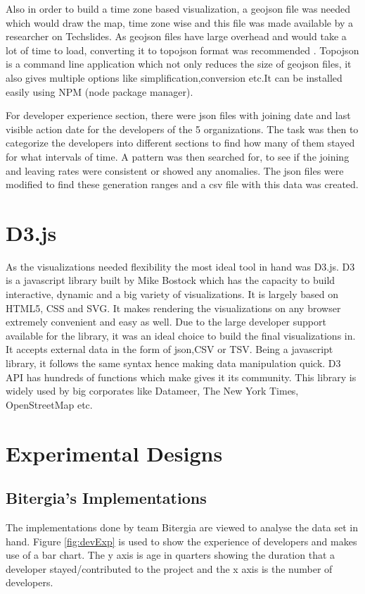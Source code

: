 \documentclass[seploa]{beavtex}
\begin{document}
Also in order to build a time zone based visualization, a geojson file was needed which would draw the map, time zone wise and this file was made available by a researcher on Techslides. As geojson files have large overhead and would take a lot of time to load, converting it to topojson format was recommended \cite{tech}. Topojson is a command line application which not only reduces the size of geojson files, it also gives multiple options like simplification,conversion etc.It can be installed easily using NPM (node package manager). 

For developer experience section, there were json files with joining date and last visible action date for the developers of the 5 organizations. The task was then to categorize the developers into different sections to find how many of them stayed for what intervals of time. A pattern was then searched for, to see if the joining and leaving rates were consistent or showed any anomalies. The json files were modified to find these generation ranges and a csv file with this data was created.

\section{D3.js}
As the visualizations needed flexibility the most ideal tool in hand was D3.js. D3 is a javascript library built by Mike Bostock which has the capacity to build interactive, dynamic and a big variety of visualizations. It is largely based on HTML5, CSS and SVG. It makes rendering the visualizations on any browser extremely convenient and easy as well. Due to the large developer support available for the library, it was an ideal choice to build the final visualizations in. It accepts external data in the form of json,CSV or TSV. Being a javascript library, it follows the same syntax hence making data manipulation quick. D3 API has hundreds of functions which make gives it its community. This library is widely used by big corporates like Datameer, The New York Times, OpenStreetMap etc.

\section{Experimental Designs}

\subsection{Bitergia's Implementations}
The implementations done by team Bitergia are viewed to analyse the data set in hand. Figure \ref{fig:devExp} is used to show the experience of developers and makes use of a bar chart. The y axis is age in quarters showing the duration that a developer stayed/contributed to the project and the x axis is the number of developers.
\end{document}
